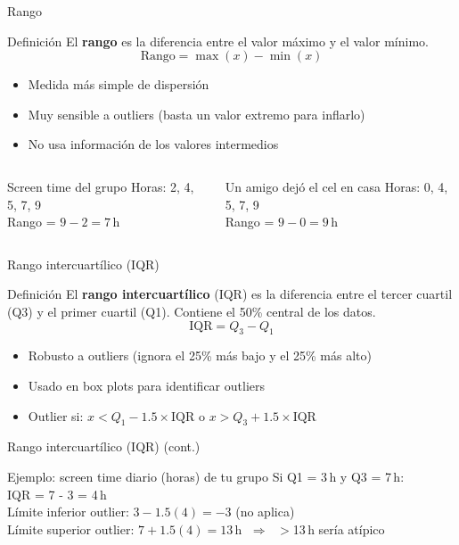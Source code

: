 \documentclass[aspectratio=169, 11pt]{beamer}
\begin{document}
\begin{frame}{Rango}
\begin{block}{Definición}
El \textbf{rango} es la diferencia entre el valor máximo y el valor mínimo.
\[
\text{Rango} = \max(x) - \min(x)
\]
\end{block}

\begin{itemize}
\item Medida más simple de dispersión
\item Muy sensible a outliers (basta un valor extremo para inflarlo)
\item No usa información de los valores intermedios
\end{itemize}

\vspace{0.5em}
\begin{columns}[T]
\begin{exampleblock}{Screen time del grupo}
Horas: 2, 4, 5, 7, 9\\
Rango = $9 - 2 = 7$\,h
\end{exampleblock}

\begin{exampleblock}{Un amigo dej\'o el cel en casa}
Horas: \alert{0}, 4, 5, 7, 9\\
Rango = $9 - 0 = 9$\,h
\end{exampleblock}
\end{columns}
\end{frame}

\begin{frame}{Rango intercuart\'ilico (IQR)}
\begin{block}{Definici\'on}
El \textbf{rango intercuart\'ilico} (IQR) es la diferencia entre el tercer cuartil (Q3) y el primer cuartil (Q1). Contiene el 50\% central de los datos.
\[
\text{IQR} = Q_3 - Q_1
\]
\end{block}

\begin{itemize}
\item Robusto a outliers (ignora el 25\% m\'as bajo y el 25\% m\'as alto)
\item Usado en box plots para identificar outliers
\item Outlier si: $x < Q_1 - 1.5 \times \text{IQR}$ o $x > Q_3 + 1.5 \times \text{IQR}$
\end{itemize}
\end{frame}

\begin{frame}{Rango intercuart\'ilico (IQR) (cont.)}
\begin{exampleblock}{Ejemplo: screen time diario (horas) de tu grupo}
Si Q1 = 3\,h y Q3 = 7\,h:\\
IQR = 7 - 3 = 4\,h\\
L\'imite inferior outlier: $3 - 1.5(4) = -3$ (no aplica)\\
L\'imite superior outlier: $7 + 1.5(4) = 13$\,h $\;\Rightarrow\;$ $>$13\,h ser\'ia at\'ipico
\end{exampleblock}
\end{frame}
\end{document}
